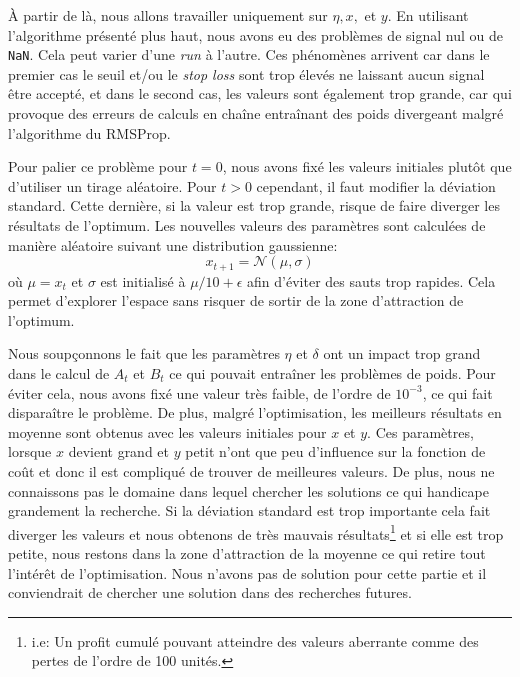 \documentclass[a4paper, 11pt]{article}
\begin{document}
  À partir de là, nous allons travailler uniquement sur $\eta,x,$ et $y$. En utilisant l'algorithme présenté plus haut, nous avons eu des problèmes
  de signal nul ou de \texttt{NaN}. Cela peut varier d'une \textit{run} à l'autre. Ces phénomènes arrivent car dans le premier cas le seuil et/ou le \textit{stop
  loss} sont trop élevés ne laissant aucun signal être accepté, et dans le second cas, les valeurs sont également trop grande, car qui provoque des erreurs
  de calculs en chaîne entraînant des poids divergeant malgré l'algorithme du RMSProp.
  
  Pour palier ce problème pour $t=0$, nous avons fixé les valeurs initiales plutôt que d'utiliser un tirage aléatoire. Pour $t>0$ cependant, il
  faut modifier la déviation standard. Cette dernière, si la valeur est trop grande, risque de faire diverger les résultats de l'optimum.
  Les nouvelles valeurs des paramètres sont calculées de manière aléatoire suivant une distribution gaussienne:
  $$x_{t+1} = \mathcal{N}(\mu, \sigma)$$
  où $\mu = x_t$ et $\sigma$ est initialisé à $\mu/10 + \epsilon$ afin d'éviter des sauts trop rapides. Cela permet d'explorer l'espace sans risquer de
  sortir de la zone d'attraction de l'optimum.
 
 Nous soupçonnons le fait que les paramètres $\eta$ et $\delta$ ont un impact trop grand dans le calcul de $A_t$ et $B_t$ ce qui pouvait entraîner les
 problèmes de poids. Pour éviter cela, nous avons fixé une valeur très faible, de l'ordre de $10^{-3}$, ce qui fait disparaître le problème.
 De plus, malgré l'optimisation, les meilleurs résultats en moyenne sont obtenus avec les valeurs initiales pour $x$ et $y$. Ces paramètres, lorsque 
 $x$ devient grand et $y$ petit n'ont que peu d'influence sur la fonction de coût et donc il est compliqué de trouver de meilleures valeurs.
 De plus, nous ne connaissons pas le domaine dans lequel chercher les solutions ce qui handicape grandement la recherche. Si la déviation standard est trop importante cela fait diverger les valeurs et nous obtenons de très mauvais résultats\footnote{i.e: Un profit cumulé pouvant atteindre des valeurs aberrante comme des pertes de l'ordre de 100 unités.} et si elle est trop petite, nous restons dans
 la zone d'attraction de la moyenne ce qui retire tout l'intérêt de l'optimisation.
 Nous n'avons pas de solution pour cette partie et il conviendrait de chercher une solution dans des recherches futures.
 
\end{document}
